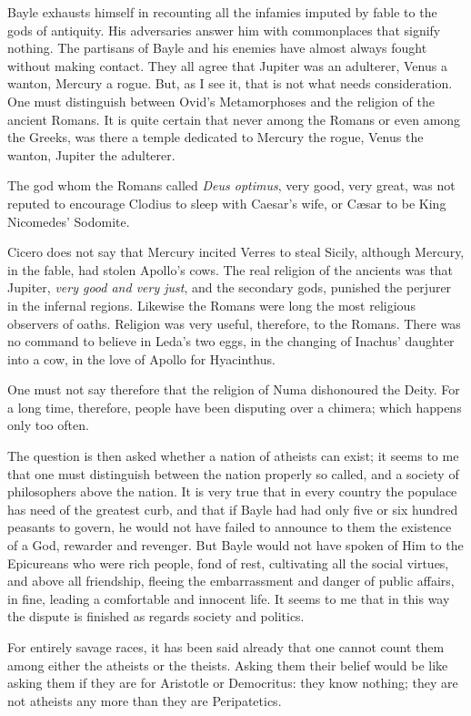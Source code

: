 Bayle exhausts himself in recounting all the infamies imputed by fable
to the gods of antiquity. His adversaries answer him with commonplaces
that signify nothing. The partisans of Bayle and his enemies have
almost always fought without making contact. They all agree that Jupiter
was an adulterer, Venus a wanton, Mercury a rogue. But, as I see it,
that is not what needs consideration. One must distinguish between
Ovid's Metamorphoses and the religion of the ancient Romans. It is quite
certain that never among the Romans or even among the Greeks, was there
a temple dedicated to Mercury the rogue, Venus the wanton, Jupiter the
adulterer.

The god whom the Romans called \textit{Deus optimus}, very good, very great,
was not reputed to encourage Clodius to sleep with Caesar's wife, or
Cæsar to be King Nicomedes' Sodomite.

Cicero does not say that Mercury incited Verres to steal Sicily,
although Mercury, in the fable, had stolen Apollo's cows. The real
religion of the ancients was that Jupiter, \textit{very good and very just},
and the secondary gods, punished the perjurer in the infernal regions.
Likewise the Romans were long the most religious observers of oaths.
Religion was very useful, therefore, to the Romans. There was no command
to believe in Leda's two eggs, in the changing of Inachus' daughter into
a cow, in the love of Apollo for Hyacinthus.

One must not say therefore that the religion of Numa dishonoured the
Deity. For a long time, therefore, people have been disputing over a
chimera; which happens only too often.

The question is then asked whether a nation of atheists can exist; it
seems to me that one must distinguish between the nation properly so
called, and a society of philosophers above the nation. It is very true
that in every country the populace has need of the greatest curb, and
that if Bayle had had only five or six hundred peasants to govern, he
would not have failed to announce to them the existence of a God,
rewarder and revenger. But Bayle would not have spoken of Him to the
Epicureans who were rich people, fond of rest, cultivating all the
social virtues, and above all friendship, fleeing the embarrassment and
danger of public affairs, in fine, leading a comfortable and innocent
life. It seems to me that in this way the dispute is finished as regards
society and politics.

For entirely savage races, it has been said already that one cannot
count them among either the atheists or the theists. Asking them their
belief would be like asking them if they are for Aristotle or
Democritus: they know nothing; they are not atheists any more than they
are Peripatetics.

